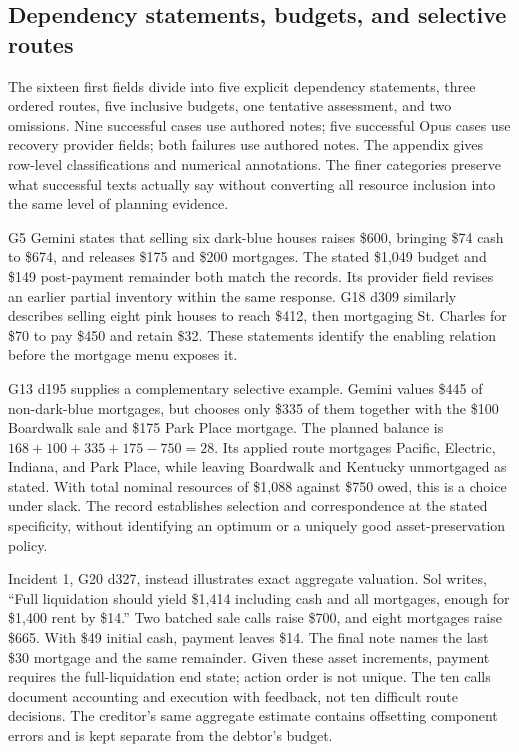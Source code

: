\subsection{Dependency statements, budgets, and selective routes}

The sixteen first fields divide into five explicit dependency statements, three ordered routes, five inclusive budgets, one tentative assessment, and two omissions. Nine successful cases use authored notes; five successful Opus cases use recovery provider fields; both failures use authored notes. The appendix gives row-level classifications and numerical annotations. The finer categories preserve what successful texts actually say without converting all resource inclusion into the same level of planning evidence.

G5 Gemini states that selling six dark-blue houses raises \$600, bringing \$74 cash to \$674, and releases \$175 and \$200 mortgages. The stated \$1,049 budget and \$149 post-payment remainder both match the records. Its provider field revises an earlier partial inventory within the same response. G18 d309 similarly describes selling eight pink houses to reach \$412, then mortgaging St. Charles for \$70 to pay \$450 and retain \$32. These statements identify the enabling relation before the mortgage menu exposes it.

G13 d195 supplies a complementary selective example. Gemini values \$445 of non-dark-blue mortgages, but chooses only \$335 of them together with the \$100 Boardwalk sale and \$175 Park Place mortgage. The planned balance is $168+100+335+175-750=28$. Its applied route mortgages Pacific, Electric, Indiana, and Park Place, while leaving Boardwalk and Kentucky unmortgaged as stated. With total nominal resources of \$1,088 against \$750 owed, this is a choice under slack. The record establishes selection and correspondence at the stated specificity, without identifying an optimum or a uniquely good asset-preservation policy.

Incident 1, G20 d327, instead illustrates exact aggregate valuation. Sol writes, ``Full liquidation should yield \$1,414 including cash and all mortgages, enough for \$1,400 rent by \$14.'' Two batched sale calls raise \$700, and eight mortgages raise \$665. With \$49 initial cash, payment leaves \$14. The final note names the last \$30 mortgage and the same remainder. Given these asset increments, payment requires the full-liquidation end state; action order is not unique. The ten calls document accounting and execution with feedback, not ten difficult route decisions. The creditor's same aggregate estimate contains offsetting component errors and is kept separate from the debtor's budget.

